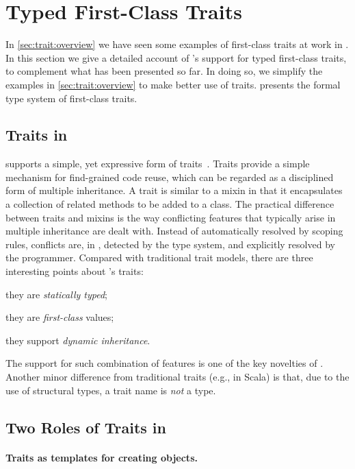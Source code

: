 \section{Typed First-Class Traits}
\label{sec:traits}

In \cref{sec:trait:overview} we have seen some examples of first-class traits at work
in \sedel. In this section we give a detailed account of \sedel's support for
typed first-class traits, to complement what has been presented so far. In doing so,
we simplify the examples in \cref{sec:trait:overview} to make better use of traits.
 presents the formal type system of first-class traits.

\subsection{Traits in \sedel}

\sedel supports a simple, yet expressive form of traits~\citep{scharli2003traits}.
Traits provide a simple mechanism for find-grained code reuse, which
can be regarded as a disciplined form of multiple inheritance. A trait is
similar to a mixin in that it encapsulates a collection of related methods to be
added to a class. The
practical difference between traits and mixins is the way conflicting features
that typically arise in multiple inheritance are dealt with. Instead of
automatically resolved by scoping rules, conflicts are, in \sedel,
detected by the type system, and explicitly resolved by the programmer. Compared
with traditional trait models, there are three interesting points about
\sedel's traits:
\begin{inparaenum}[(1)]
\item they are \emph{statically typed};
\item they are \emph{first-class} values;
\item they support \emph{dynamic inheritance}.
\end{inparaenum}
The support for such combination of features is one of the key novelties of \sedel.
Another minor difference from traditional traits (e.g., in Scala) is that,
due to the use of structural types, a trait name is \emph{not} a type.

\subsection{Two Roles of Traits in \sedel}

\paragraph{Traits as templates for creating objects.}

